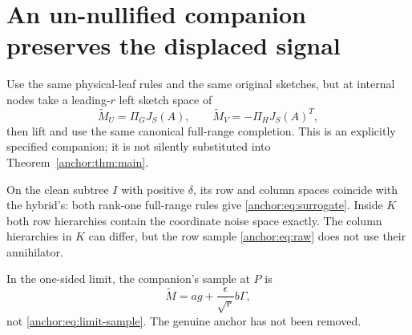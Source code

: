 \documentclass[11pt,oneside,openany,a4paper]{book}
\numberwithin{equation}{chapter}
\theoremstyle{definition}
\theoremstyle{remark}
\begin{document}
\section{An un-nullified companion preserves the displaced signal}\label{anchor:sec:backup}
Use the same physical-leaf rules and the same original sketches, but at internal nodes take a leading-$r$ left sketch space of
\begin{equation}\label{anchor:eq:raw}
 \widetilde M_U=\Pi_GJ_S(A),\qquad
 \widetilde M_V=-\Pi_HJ_S(A)^T,
\end{equation}
then lift and use the same canonical full-range completion. This is an explicitly specified companion; it is not silently substituted into Theorem~\ref{anchor:thm:main}.

On the clean subtree $I$ with positive $\delta$, its row and column spaces coincide with the hybrid's: both rank-one full-range rules give \eqref{anchor:eq:surrogate}. Inside $K$ both row hierarchies contain the coordinate noise space exactly. The column hierarchies in $K$ can differ, but the row sample \eqref{anchor:eq:raw} does not use their annihilator.

In the one-sided limit, the companion's sample at $P$ is
\[
 \widetilde M=ag+\frac\epsilon{\sqrt r}b\Gamma,
\]
not \eqref{anchor:eq:limit-sample}. The genuine anchor has not been removed.
\end{document}
